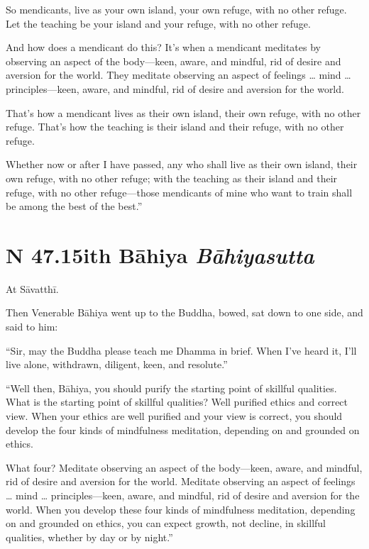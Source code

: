 \documentclass[12pt,openany]{book}%
\newcommand*{\suttatitleacronym}[1]{\smaller[2]{#1}\vspace*{.3em}}
\newcommand*{\suttatitletranslation}[1]{\linebreak{#1}}
\newcommand*{\suttatitleroot}[1]{\linebreak\smaller[2]\itshape{#1}}
\newcommand*{\tocacronym}[1]{\hspace*{-3.3em}{#1}\quad}
\newcommand*{\toctranslation}[1]{#1}
\newcommand*{\tocroot}[1]{(\textit{#1})}
\begin{document}
So mendicants, live as your own island, your own refuge, with no other refuge. Let the teaching be your island and your refuge, with no other refuge. 

And how does a mendicant do this? It’s when a mendicant meditates by observing an aspect of the body—keen, aware, and mindful, rid of desire and aversion for the world. They meditate observing an aspect of feelings … mind … principles—keen, aware, and mindful, rid of desire and aversion for the world. 

That’s how a mendicant lives as their own island, their own refuge, with no other refuge. That’s how the teaching is their island and their refuge, with no other refuge. 

Whether now or after I have passed, any who shall live as their own island, their own refuge, with no other refuge; with the teaching as their island and their refuge, with no other refuge—those mendicants of mine who want to train shall be among the best of the best.” 

%
\section*{{\suttatitleacronym SN 47.15}{\suttatitletranslation With Bāhiya }{\suttatitleroot Bāhiyasutta}}
\addcontentsline{toc}{section}{\tocacronym{SN 47.15} \toctranslation{With Bāhiya } \tocroot{Bāhiyasutta}}

At \textsanskrit{Sāvatthī}. 

Then Venerable \textsanskrit{Bāhiya} went up to the Buddha, bowed, sat down to one side, and said to him: 

“Sir, may the Buddha please teach me Dhamma in brief. When I’ve heard it, I’ll live alone, withdrawn, diligent, keen, and resolute.” 

“Well then, \textsanskrit{Bāhiya}, you should purify the starting point of skillful qualities. What is the starting point of skillful qualities? Well purified ethics and correct view. When your ethics are well purified and your view is correct, you should develop the four kinds of mindfulness meditation, depending on and grounded on ethics. 

What four? Meditate observing an aspect of the body—keen, aware, and mindful, rid of desire and aversion for the world. Meditate observing an aspect of feelings … mind … principles—keen, aware, and mindful, rid of desire and aversion for the world. When you develop these four kinds of mindfulness meditation, depending on and grounded on ethics, you can expect growth, not decline, in skillful qualities, whether by day or by night.” 
\end{document}
